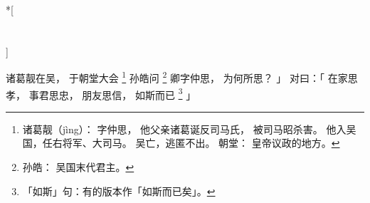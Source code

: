 
\switchcolumn[0]*[\section{}]

诸葛靓在吴，
于朝堂大会%
\footnote{%
    诸葛靓（jìng）：
        字仲思，
        他父亲诸葛诞反司马氏，
        被司马昭杀害。
        他入吴国，任右将军、大司马。
        吴亡，逃匿不出。
    朝堂：
        皇帝议政的地方。
}%
孙皓问%
\footnote{%
    孙皓：
        吴国末代君主。
}%
    卿字仲思，
    为何所思？
」
对曰：「
    在家思孝，
    事君思忠，
    朋友思信，
    如斯而已%
    \footnote{%
        「如斯」句：有的版本作「如斯而已矣」。
    }%
」

\switchcolumn



